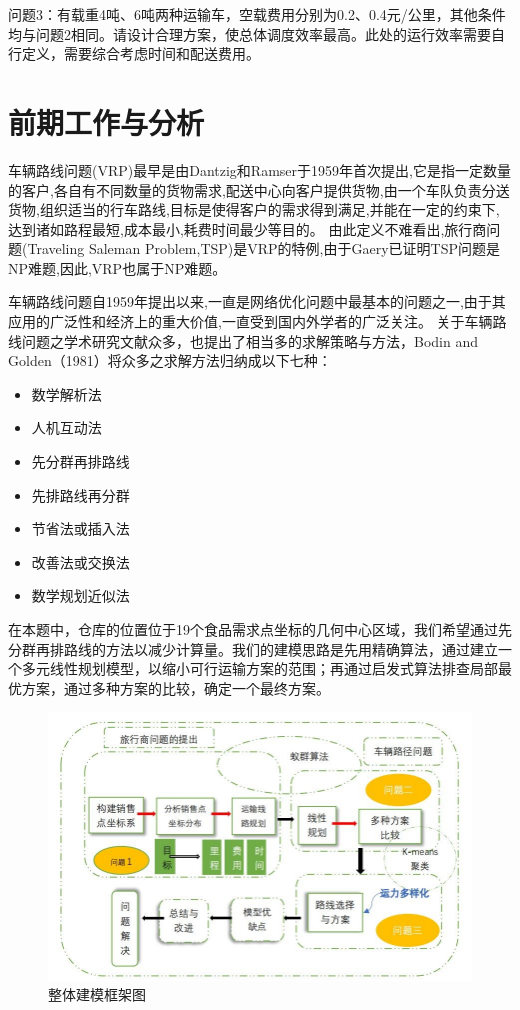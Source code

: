\documentclass{cumcmthesis}
\begin{document}
    问题3：有载重4吨、6吨两种运输车，空载费用分别为0.2、0.4元/公里，其他条件均与问题2相同。请设计合理方案，使总体调度效率最高。此处的运行效率需要自行定义，需要综合考虑时间和配送费用。

\section{前期工作与分析}
车辆路线问题(VRP)最早是由Dantzig和Ramser于1959年首次提出,它是指一定数量的客户,各自有不同数量的货物需求,配送中心向客户提供货物,由一个车队负责分送货物,组织适当的行车路线,目标是使得客户的需求得到满足,并能在一定的约束下,达到诸如路程最短,成本最小,耗费时间最少等目的。
由此定义不难看出,旅行商问题(Traveling Saleman Problem,TSP)是VRP的特例,由于Gaery已证明TSP问题是NP难题,因此,VRP也属于NP难题。

车辆路线问题自1959年提出以来,一直是网络优化问题中最基本的问题之一,由于其应用的广泛性和经济上的重大价值,一直受到国内外学者的广泛关注。
关于车辆路线问题之学术研究文献众多，也提出了相当多的求解策略与方法，Bodin and Golden（1981）将众多之求解方法归纳成以下七种：
\begin{itemize}
    \item 数学解析法
    \item 人机互动法
    \item 先分群再排路线
    \item 先排路线再分群
    \item 节省法或插入法
    \item 改善法或交换法
    \item 数学规划近似法
\end{itemize}

在本题中，仓库的位置位于19个食品需求点坐标的几何中心区域，我们希望通过先分群再排路线的方法以减少计算量。我们的建模思路是先用精确算法，通过建立一个多元线性规划模型，以缩小可行运输方案的范围；再通过启发式算法排查局部最优方案，通过多种方案的比较，确定一个最终方案。
\begin{figure}[H]
        \centering
        \includegraphics[width=.7\textwidth]{figure/frame.jpg}
        \caption{整体建模框架图}
        \label{fig:frame}
\end{figure}
\end{document}
